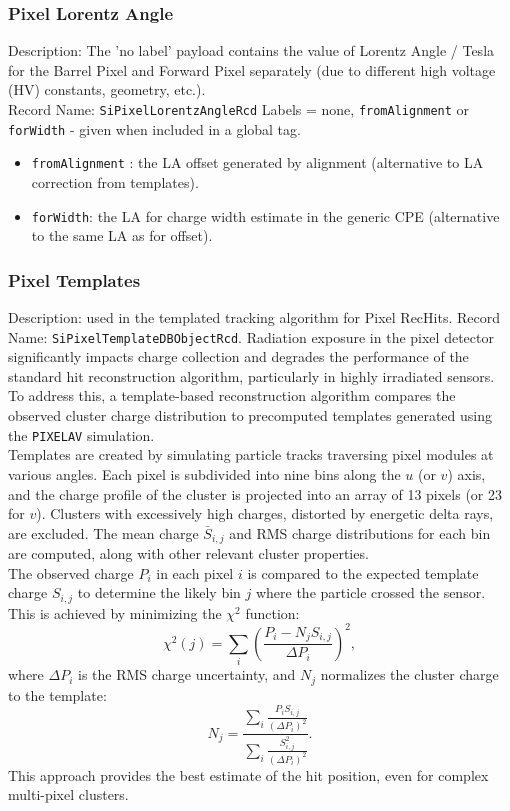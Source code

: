 \subsubsection{Pixel Lorentz Angle}
Description: The 'no label' payload contains the value of Lorentz Angle / Tesla for the Barrel Pixel and Forward Pixel separately (due to different high voltage (HV) constants, geometry, etc.).\\
Record Name: \texttt{SiPixelLorentzAngleRcd} 
Labels = none, \texttt{fromAlignment} or \texttt{forWidth} - given when included in a global tag.
\begin{itemize}
\item \texttt{fromAlignment} : the LA offset generated by alignment (alternative to LA correction from templates).
\item \texttt{forWidth}: the LA for charge width estimate in the generic CPE (alternative to the same LA as for offset). 
\end{itemize}

\subsubsection{Pixel Templates}
Description: used in the templated tracking algorithm for Pixel RecHits.
Record Name:  \texttt{SiPixelTemplateDBObjectRcd}. 
Radiation exposure in the pixel detector significantly impacts charge collection and degrades the performance of the standard hit reconstruction algorithm, particularly in highly irradiated sensors. To address this, a template-based reconstruction algorithm compares the observed cluster charge distribution to precomputed templates generated using the \texttt{PIXELAV} simulation.\\
Templates are created by simulating particle tracks traversing pixel modules at various angles. Each pixel is subdivided into nine bins along the \(u\) (or \(v\)) axis, and the charge profile of the cluster is projected into an array of 13 pixels (or 23 for \(v\)). Clusters with excessively high charges, distorted by energetic delta rays, are excluded. The mean charge \(\bar{S}_{i,j}\) and RMS charge distributions for each bin are computed, along with other relevant cluster properties.\\
The observed charge \(P_i\) in each pixel \(i\) is compared to the expected template charge \(S_{i,j}\) to determine the likely bin \(j\) where the particle crossed the sensor. This is achieved by minimizing the \(\chi^2\) function:
\[
\chi^2(j) = \sum_i \left( \frac{P_i - N_j S_{i,j}}{\Delta P_i} \right)^2,
\]
where \(\Delta P_i\) is the RMS charge uncertainty, and \(N_j\) normalizes the cluster charge to the template:
\[
N_j = \frac{\sum_i \frac{P_i S_{i,j}}{(\Delta P_i)^2}}{\sum_i \frac{S_{i,j}^2}{(\Delta P_i)^2}}.
\]
This approach provides the best estimate of the hit position, even for complex multi-pixel clusters.\\

